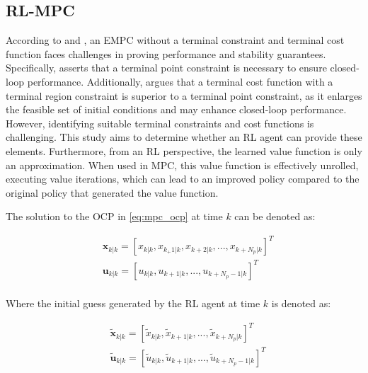 \subsection{RL-MPC}
According to \citet{ellisTutorialReviewEconomic2014} and \citet{amritEconomicOptimizationUsing2011}, an EMPC without a terminal constraint and terminal cost function faces challenges in proving performance and stability guarantees. Specifically, \citet{ellisTutorialReviewEconomic2014} asserts that a terminal point constraint is necessary to ensure closed-loop performance. Additionally, \citet{amritEconomicOptimizationUsing2011} argues that a terminal cost function with a terminal region constraint is superior to a terminal point constraint, as it enlarges the feasible set of initial conditions and may enhance closed-loop performance. However, identifying suitable terminal constraints and cost functions is challenging. This study aims to determine whether an RL agent can provide these elements. Furthermore, from an RL perspective, the learned value function is only an approximation. When used in MPC, this value function is effectively unrolled, executing value iterations, which can lead to an improved policy compared to the original policy that generated the value function.

The solution to the OCP in \autoref{eq:mpc_ocp} at time $k$ can be denoted as:

\begin{equation}\label{eq:sol-mpc-ocp}
	\begin{aligned}
		&\mathbf{x}_{k|k} = [x_{k|k},x_{k_+ 1|k},x_{k + 2|k}, ...,x_{k + N_p|k}]^T \\ 
		&\mathbf{u}_{k|k} = [u_{k|k},u_{k + 1|k}, ...,u_{k + N_p-1|k}]^T \\
	\end{aligned}
\end{equation}

Where the initial guess generated by the RL agent at time $k$ is denoted as:

\begin{equation}\label{eq:initial-guess}
	\begin{aligned}
		&\tilde{\mathbf{x}}_{k|k} = [\tilde{x}_{k|k},\tilde{x}_{k+1|k},...,\tilde{x}_{k + N_p|k}]^T \\ 
		&\tilde{\mathbf{u}}_{k|k} = [\tilde{u}_{k|k},\tilde{u}_{k + 1|k},...,\tilde{u}_{k + N_p - 1|k}]^T\\ 
	\end{aligned}
\end{equation}

